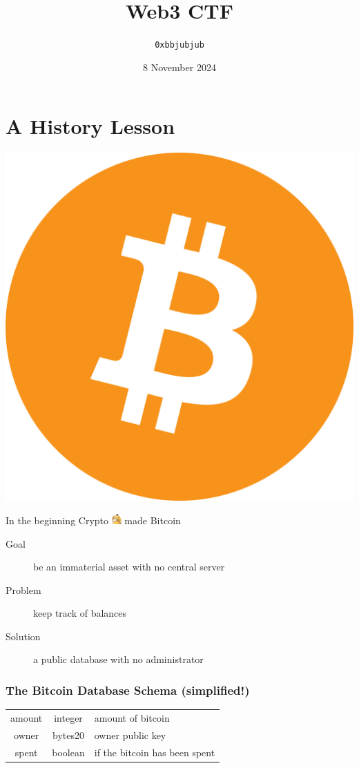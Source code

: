 \documentclass[aspectratio=169,17pt]{beamer}
\title{Web3 CTF}
\author{\texttt{0xbbjubjub}}
\institute{\polyglots}
\date{8 November 2024}
\begin{document}
\titleframe{}

\section{A History Lesson}
\begin{frame}
	\centering
	\includegraphics[height=.7\textheight]{assets/1200px-Bitcoin.svg.png}

	In the beginning Crypto \includegraphics[width=1em]{assets/psyduck.png} made Bitcoin
\end{frame}

\begin{frame}
	\begin{description}
		\item[Goal] be an immaterial asset with no central server
		\item[Problem] keep track of balances
		\item[Solution] a public database with no administrator
	\end{description}
\end{frame}

\begin{frame}
	\frametitle{The Bitcoin Database Schema (simplified!)}
	\begin{tabular}{ccl}
		\ttfamily amount & \ttfamily integer & amount of bitcoin
		\\
		\ttfamily owner & \ttfamily bytes20 & owner public key
		\\
		\ttfamily spent & \ttfamily boolean & if the bitcoin has been spent
	\end{tabular}
\end{frame}
\end{document}
